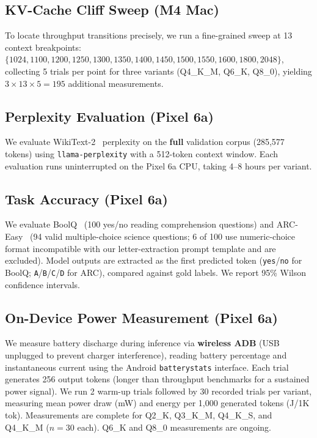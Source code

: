 \documentclass{article}
\begin{document}
\subsection{KV-Cache Cliff Sweep (M4 Mac)}

To locate throughput transitions precisely, we run a fine-grained sweep at 13 context breakpoints: $\{1024, 1100, 1200, 1250, 1300, 1350, 1400, 1450, 1500, 1550, 1600, 1800, 2048\}$, collecting 5 trials per point for three variants (Q4\_K\_M, Q6\_K, Q8\_0), yielding $3 \times 13 \times 5 = 195$ additional measurements.

\subsection{Perplexity Evaluation (Pixel 6a)}

We evaluate WikiText-2~\cite{wikitext2} perplexity on the \textbf{full} validation corpus (285,577 tokens) using \texttt{llama-perplexity} with a 512-token context window. Each evaluation runs uninterrupted on the Pixel 6a CPU, taking 4–8 hours per variant.

\subsection{Task Accuracy (Pixel 6a)}

We evaluate BoolQ~\cite{boolq} (100 yes/no reading comprehension questions) and ARC-Easy~\cite{arc} (94 valid multiple-choice science questions; 6 of 100 use numeric-choice format incompatible with our letter-extraction prompt template and are excluded). Model outputs are extracted as the first predicted token (\texttt{yes}/\texttt{no} for BoolQ; \texttt{A}/\texttt{B}/\texttt{C}/\texttt{D} for ARC), compared against gold labels. We report 95\% Wilson confidence intervals.

\subsection{On-Device Power Measurement (Pixel 6a)}

We measure battery discharge during inference via \textbf{wireless ADB} (USB unplugged to prevent charger interference), reading battery percentage and instantaneous current using the Android \texttt{batterystats} interface. Each trial generates 256 output tokens (longer than throughput benchmarks for a sustained power signal). We run 2 warm-up trials followed by 30 recorded trials per variant, measuring mean power draw (mW) and energy per 1,000 generated tokens (J/1K\,tok). Measurements are complete for Q2\_K, Q3\_K\_M, Q4\_K\_S, and Q4\_K\_M ($n=30$ each). Q6\_K and Q8\_0 measurements are ongoing.
\end{document}
